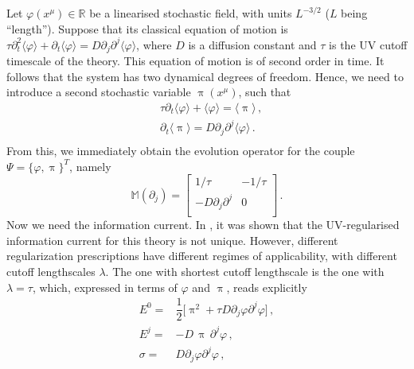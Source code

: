 \documentclass[a4paper, amsfonts, amssymb, amsmath, reprint, showkeys, nofootinbib, twoside,notitlepage,onecolumn]{revtex4-2}
\newcommand{\Ma}{{\mathbb{M}}}
\theoremstyle{definition}
\begin{document}
Let $\varphi(x^\mu) \in \mathbb{R}$ be a linearised stochastic field, with units $L^{-3/2}$ ($L$ being ``length''). Suppose that its classical equation of motion is $\tau \partial^2_t\langle \varphi \rangle +\partial_t \langle \varphi \rangle =D \partial_j \partial^j \langle \varphi \rangle$, where $D$ is a diffusion constant and $\tau$ is the UV cutoff timescale of the theory.  This equation of motion is of second order in time. It follows that the system has two dynamical degrees of freedom. Hence, we need to introduce a second stochastic variable $\uppi(x^\mu)$, such that
\begin{equation}\label{classuzzuz}
    \begin{split}
& \tau \partial_t \langle \varphi \rangle +\langle \varphi \rangle = \langle \uppi \rangle \, , \\
& \partial_t \langle \uppi \rangle = D \partial_j \partial^j \langle \varphi \rangle \, . \\
    \end{split}
\end{equation}
From this, we immediately obtain the evolution operator for the couple $\Psi =\{\varphi,\uppi\}^T$, namely
\begin{equation}
    \Ma(\partial_j) = 
    \begin{bmatrix}
        1/\tau & -1/\tau \\
        -D \partial_j \partial^j &  0 \\
    \end{bmatrix} \, .
\end{equation}
Now we need the information current. In \cite{Gavassino:2024ufs}, it was shown that the UV-regularised information current for this theory is not unique. However, different regularization prescriptions have different regimes of applicability, with different cutoff lengthscales $\lambda$. The one with shortest cutoff lengthscale is the one with $\lambda=\tau$, which, expressed in terms of $\varphi$ and $\uppi$, reads explicitly
\begin{equation}\label{INFOONA}
\begin{split}
E^0 ={}& \dfrac{1}{2} \big[ \uppi^2+ \tau  D \partial_j \varphi \partial^j \varphi \big] \, ,\\
E^j ={}& -D \, \uppi \, \partial^j \varphi \, ,\\
\sigma ={}&  D \partial_j \varphi \partial^j \varphi \, , \\
\end{split}
\end{equation}
\end{document}
